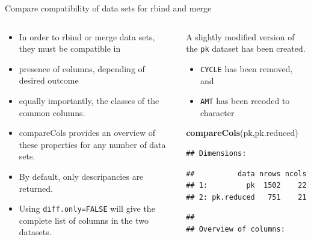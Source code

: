 \documentclass[
  8pt,
  ignorenonframetext,
  aspectratio=169]{beamer}
\newenvironment{Shaded}{\begin{snugshade}}{\end{snugshade}}
\newcommand{\KeywordTok}[1]{\textcolor[rgb]{0.13,0.29,0.53}{\textbf{#1}}}
\newcommand{\NormalTok}[1]{#1}
\providecommand{\tightlist}{%
  \setlength{\itemsep}{0pt}\setlength{\parskip}{0pt}}
\begin{document}
\begin{frame}[fragile]{Compare compatibility of data sets for rbind and
merge}
\protect\hypertarget{compare-compatibility-of-data-sets-for-rbind-and-merge}{}
\begin{columns}[T]
\begin{column}{0.48\textwidth}
\begin{itemize}
\tightlist
\item
  In order to rbind or merge data sets, they must be compatible in
\item
  presence of columns, depending of desired outcome
\item
  equally importantly, the classes of the common columns.
\item
  compareCols provides an overview of these properties for any number of
  data sets.
\item
  By default, only descripancies are returned.
\item
  Using \texttt{diff.only=FALSE} will give the complete list of columns
  in the two datasets.
\end{itemize}
\end{column}

\begin{column}{0.48\textwidth}
A slightly modified version of the \texttt{pk} dataset has been created.

\begin{itemize}
\tightlist
\item
  \texttt{CYCLE} has been removed, and
\item
  \texttt{AMT} has been recoded to character
\end{itemize}

\begin{Shaded}
\begin{Highlighting}[]
\KeywordTok{compareCols}\NormalTok{(pk,pk.reduced)}
\end{Highlighting}
\end{Shaded}

\begin{verbatim}
## Dimensions:
\end{verbatim}

\begin{verbatim}
##          data nrows ncols
## 1:         pk  1502    22
## 2: pk.reduced   751    21
\end{verbatim}

\begin{verbatim}
## 
## Overview of columns:
\end{verbatim}


\end{column}
\end{columns}
\end{frame}
\end{document}
